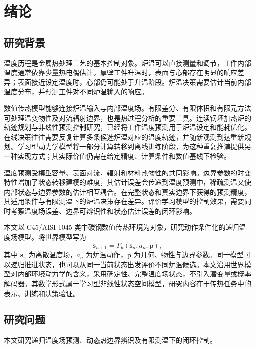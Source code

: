 \chapter{绪论}

\section{研究背景}

温度历程是金属热处理工艺的基本控制对象。炉温可以直接测量和调节，工件内部温度通常依靠少量热电偶估计。厚壁工件升温时，表面与心部存在明显的响应差异；表面接近设定温度时，心部仍可能处于升温阶段。炉温决策需要估计当前内部温度分布，并预测工件对不同炉温输入的响应。

数值传热模型能够连接炉温输入与内部温度场。有限差分、有限体积和有限元方法可处理温变物性及对流辐射边界，也是热过程分析的重要工具。连续钢坯加热炉的轨迹规划与非线性预测控制研究，已经将工件温度预测用于炉温设定和能耗优化\cite{steinboeck2011trajectory,steinboeck2013nmpc}。在线决策往往需要反复计算多条候选炉温对应的温度轨迹，并随新观测到达重新规划。学习型动力学模型将一部分计算转移到离线训练阶段，为这种重复推演提供另一种实现方式；其实际价值仍需在给定精度、计算条件和数值基线下检验。

温度预测受模型容量、表面对流、辐射和材料热物性的共同影响。边界参数的时变特性增加了状态转移建模的难度，其估计误差会传递到温度预测中，稀疏测温又使内部状态与边界参数的估计相互耦合。在完整状态和真实边界下获得的预测精度，其适用条件与有限测温下的炉温决策存在差异。评价学习模型的控制效果，需要同时考察温度场误差、边界可辨识性和状态估计误差的闭环影响。

本文以 C45/AISI 1045 类中碳钢数值传热环境为对象，研究动作条件化的递归温度场模型。将世界模型写为
\begin{equation}
  \bm{s}_{n+1}=F_{\theta}(\bm{s}_n,a_n,\bm{p}),
  \label{eq:wm_definition}
\end{equation}
其中 $\bm{s}_n$ 为离散温度场，$a_n$ 为炉温动作，$\bm{p}$ 为几何、物性与边界参数。同一模型可以递归推进状态，也可以从同一当前状态出发评价不同炉温候选。本文沿用世界模型对内部环境动力学的含义\cite{ha2018worldmodels}，采用确定性、完整温度场状态，不引入潜变量或概率解码器。其数学形式属于学习型非线性状态空间模型，研究内容在于传热任务中的表示、训练和决策验证。

\section{研究问题}

本文研究递归温度场预测、动态热边界辨识及有限测温下的闭环控制。

